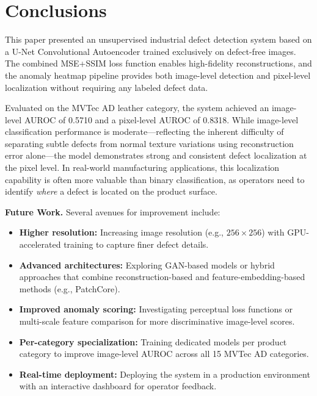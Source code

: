 \documentclass{article}
\begin{document}
\section{Conclusions}

This paper presented an unsupervised industrial defect detection system based on a U-Net Convolutional Autoencoder trained exclusively on defect-free images. The combined MSE+SSIM loss function enables high-fidelity reconstructions, and the anomaly heatmap pipeline provides both image-level detection and pixel-level localization without requiring any labeled defect data.

Evaluated on the MVTec AD leather category, the system achieved an image-level AUROC of 0.5710 and a pixel-level AUROC of 0.8318. While image-level classification performance is moderate---reflecting the inherent difficulty of separating subtle defects from normal texture variations using reconstruction error alone---the model demonstrates strong and consistent defect localization at the pixel level. In real-world manufacturing applications, this localization capability is often more valuable than binary classification, as operators need to identify \emph{where} a defect is located on the product surface.

\textbf{Future Work.} Several avenues for improvement include:
\begin{itemize}
    \item \textbf{Higher resolution:} Increasing image resolution (e.g., $256 \times 256$) with GPU-accelerated training to capture finer defect details.
    \item \textbf{Advanced architectures:} Exploring GAN-based models or hybrid approaches that combine reconstruction-based and feature-embedding-based methods (e.g., PatchCore).
    \item \textbf{Improved anomaly scoring:} Investigating perceptual loss functions or multi-scale feature comparison for more discriminative image-level scores.
    \item \textbf{Per-category specialization:} Training dedicated models per product category to improve image-level AUROC across all 15 MVTec AD categories.
    \item \textbf{Real-time deployment:} Deploying the system in a production environment with an interactive dashboard for operator feedback.
\end{itemize}
\end{document}

